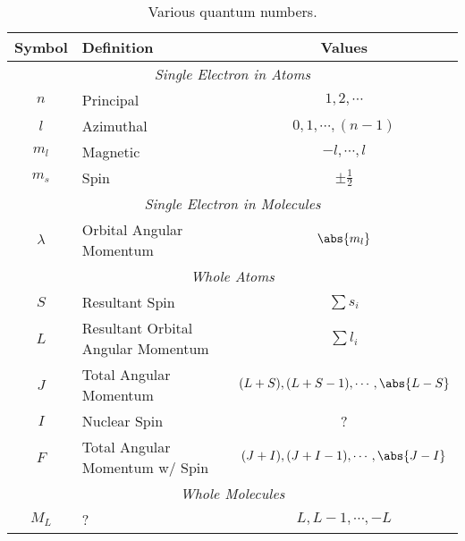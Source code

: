 \documentclass[11pt, twoside, fleqn]{report}
\begin{document}
\begin{table}[H]
    \centering
    \caption{Various quantum numbers.}
    \label{t:quantum_numbers}
    \begin{tabular}{clc}
        \toprule
        Symbol    & Definition                            & Values                                      \\
        \midrule
        \multicolumn{3}{c}{\textit{Single Electron in Atoms}}                                           \\
        \cmidrule(lr){1-3}
        $n$       & Principal                             & $1, 2, \dotsb$                              \\
        $l$       & Azimuthal                             & $0, 1, \dotsb, (n - 1)$                     \\
        $m_{l}$   & Magnetic                              & $-l, \dotsb, l$                             \\
        $m_{s}$   & Spin                                  & $\pm \frac{1}{2}$                           \\
        \multicolumn{3}{c}{\textit{Single Electron in Molecules}}                                       \\
        \cmidrule(lr){1-3}
        $\lambda$ & Orbital Angular Momentum              & $\abs{m_{l}}$                               \\
        \multicolumn{3}{c}{\textit{Whole Atoms}}                                                        \\
        \cmidrule(lr){1-3}
        $S$       & Resultant Spin                        & $\sum s_{i}$                                \\
        $L$       & Resultant Orbital Angular Momentum    & $\sum l_{i}$                                \\
        $J$       & Total Angular Momentum                & $(L + S), (L + S - 1), \dotsb, \abs{L - S}$ \\
        $I$       & Nuclear Spin                          & ?                                           \\
        $F$       & Total Angular Momentum w/ Spin        & $(J + I), (J + I - 1), \dotsb, \abs{J - I}$ \\
        \multicolumn{3}{c}{\textit{Whole Molecules}}                                                    \\
        \cmidrule(lr){1-3}
        $M_{L}$   & ?                                     & $L, L - 1, \dotsb, -L$                      \\

\end{tabular}
\end{table}
\end{document}
